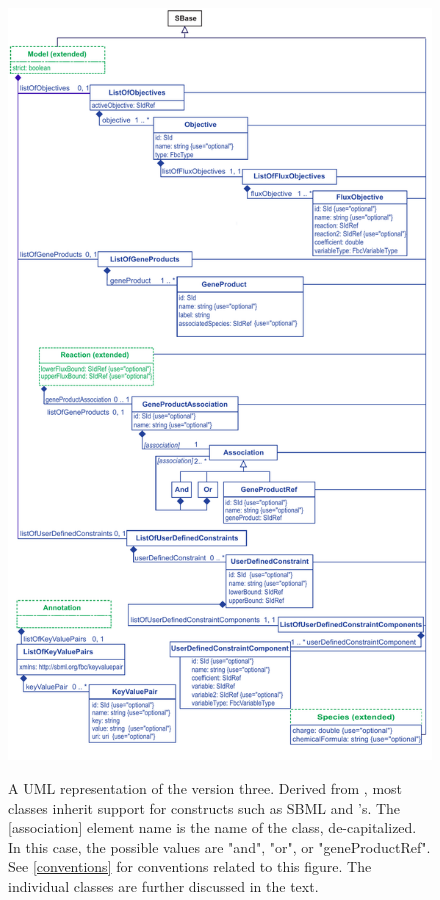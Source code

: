 \begin{figure}[ht!]
  \centering
  \includegraphics[height=0.85\textheight]{images/fbc_uml_v3.pdf}\\
  \caption{A UML representation of the \FBCPackage version three. Derived from \SBase, most
	\FBC classes inherit support for constructs such as SBML \Notes and
	\Annotation's. The [association] element name is the name of the class, de-capitalized.  In this case, the possible values are "and", "or", or "geneProductRef". See \ref{conventions} for conventions related to this figure.
	The individual classes are further discussed in the text.}
  \label{fig:fbc_uml}
\end{figure}

